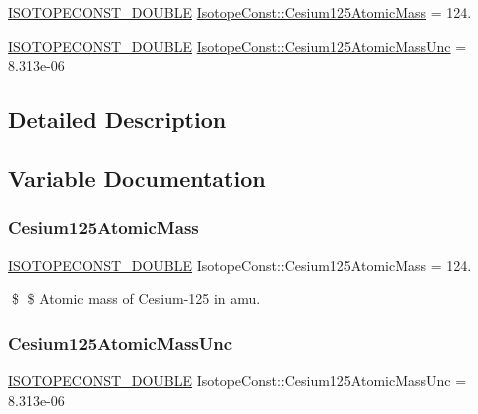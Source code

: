 \begin{DoxyCompactItemize}
\item 
\mbox{\hyperlink{group___isotope_const-_macros_ga8f45a7272ce02c0b4c65c44636ed719a}{I\+S\+O\+T\+O\+P\+E\+C\+O\+N\+S\+T\+\_\+\+D\+O\+U\+B\+LE}} \mbox{\hyperlink{group___isotope_const-_cesium-_cs125_ga5235f0f23dd17d5223fde3c9d12cbfbc}{Isotope\+Const\+::\+Cesium125\+Atomic\+Mass}} = 124.
\item 
\mbox{\hyperlink{group___isotope_const-_macros_ga8f45a7272ce02c0b4c65c44636ed719a}{I\+S\+O\+T\+O\+P\+E\+C\+O\+N\+S\+T\+\_\+\+D\+O\+U\+B\+LE}} \mbox{\hyperlink{group___isotope_const-_cesium-_cs125_ga88fd2261d896c1399d8c0346148bfcc8}{Isotope\+Const\+::\+Cesium125\+Atomic\+Mass\+Unc}} = 8.\+313e-\/06
\end{DoxyCompactItemize}


\subsection{Detailed Description}


\subsection{Variable Documentation}
\mbox{\label{group___isotope_const-_cesium-_cs125_ga5235f0f23dd17d5223fde3c9d12cbfbc}} 
\subsubsection{\texorpdfstring{Cesium125\+Atomic\+Mass}{Cesium125AtomicMass}}
{\footnotesize\ttfamily \mbox{\hyperlink{group___isotope_const-_macros_ga8f45a7272ce02c0b4c65c44636ed719a}{I\+S\+O\+T\+O\+P\+E\+C\+O\+N\+S\+T\+\_\+\+D\+O\+U\+B\+LE}} Isotope\+Const\+::\+Cesium125\+Atomic\+Mass = 124.}

\$ \$ Atomic mass of Cesium-\/125 in amu. \mbox{\label{group___isotope_const-_cesium-_cs125_ga88fd2261d896c1399d8c0346148bfcc8}} 
\subsubsection{\texorpdfstring{Cesium125\+Atomic\+Mass\+Unc}{Cesium125AtomicMassUnc}}
{\footnotesize\ttfamily \mbox{\hyperlink{group___isotope_const-_macros_ga8f45a7272ce02c0b4c65c44636ed719a}{I\+S\+O\+T\+O\+P\+E\+C\+O\+N\+S\+T\+\_\+\+D\+O\+U\+B\+LE}} Isotope\+Const\+::\+Cesium125\+Atomic\+Mass\+Unc = 8.\+313e-\/06}

